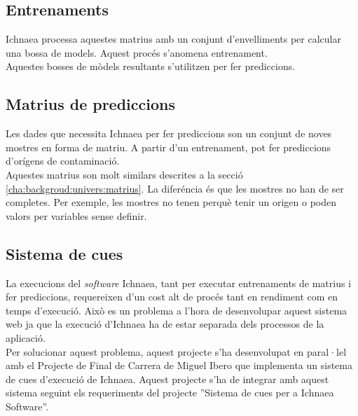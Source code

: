 \subsection{Entrenaments}
\label{subsec:backgroundTrainings}
Ichnaea processa aquestes matrius amb un conjunt d'envelliments per calcular una bossa de models. Aquest proc\'{e}s s'anomena entrenament. \\

Aquestes bosses de m\`{o}dels resultants s'utilitzen per fer prediccions.

\subsection{Matrius de prediccions}
Les dades que necessita Ichnaea per fer prediccions son un conjunt de noves mostres en forma de matriu. A partir d'un entrenament, pot fer prediccions d'orígens de contaminaci\'{o}.\\ 

Aquestes matrius son molt similars descrites a la secci\'{o} \ref{cha:backgroud:univers:matrius}. La difer\'{e}ncia \'{e}s que les mostres no han de ser completes. Per exemple, les mostres no tenen perquè tenir un origen o poden valors per variables sense definir.

\subsection{Sistema de cues}
La execucions del \textit{software} Ichnaea, tant per executar entrenaments de matrius i fer prediccions, requereixen d'un cost alt de proc\'{e}s tant en rendiment com en temps d'execució. Això es un problema a l'hora de desenvolupar aquest sistema web ja que la execució d'Ichnaea ha de estar separada dels processos de la aplicació.\\

Per solucionar aquest problema, aquest projecte s'ha desenvolupat en paral·lel amb el Projecte de Final de Carrera de Miguel Ibero que implementa un sistema de cues d'execuci\'{o} de Ichnaea. Aquest projecte s'ha de integrar amb aquest sistema seguint els requeriments del projecte ''Sistema de cues per a Ichnaea Software''.